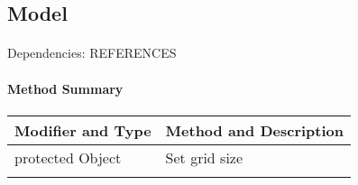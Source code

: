 \subsection{Model}
\paragraph*{}
\paragraph*{}
Dependencies: REFERENCES
\paragraph*{Method Summary}
\paragraph*{}
\begin{tabular}{lp{10cm}}
	\hline
	\textbf{Modifier and Type} & \textbf{Method and Description} \\ \hline
	protected Object & Set grid size \\
	& \lipsum[1] \\ \hline
\end{tabular}